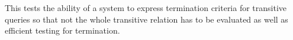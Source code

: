 
This tests the ability of a system to express termination criteria for
transitive queries so that not the whole transitive relation has to be evaluated
as well as efficient testing for termination.


